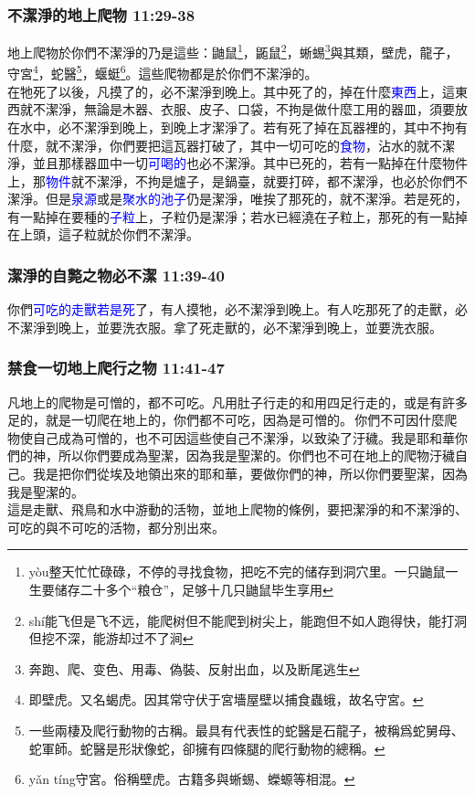 \subsubsection{不潔淨的地上爬物 11:29-38}
地上爬物於你們不潔淨的乃是這些：鼬鼠\footnote{yòu整天忙忙碌碌，不停的寻找食物，把吃不完的储存到洞穴里。一只鼬鼠一生要储存二十多个“粮仓”，足够十几只鼬鼠毕生享用}，鼫鼠\footnote{shí能飞但是飞不远，能爬树但不能爬到树尖上，能跑但不如人跑得快，能打洞但挖不深，能游却过不了涧}，蜥蜴\footnote{奔跑、爬、变色、用毒、偽裝、反射出血，以及断尾逃生}與其類，壁虎，龍子，守宮\footnote{即壁虎。又名蝎虎。因其常守伏于宮墻屋壁以捕食蟲蛾，故名守宮。}，蛇醫\footnote{一些兩棲及爬行動物的古稱。最具有代表性的蛇醫是石龍子，被稱爲蛇舅母、蛇軍師。蛇醫是形狀像蛇，卻擁有四條腿的爬行動物的總稱。}，蝘蜓\footnote{yǎn tíng守宮。俗稱壁虎。古籍多與蜥蜴、蠑螈等相混。}。這些爬物都是於你們不潔淨的。\\
在牠死了以後，凡摸了的，必不潔淨到晚上。其中死了的，掉在什麼\textcolor{blue}{東西}上，這東西就不潔淨，無論是木器、衣服、皮子、口袋，不拘是做什麼工用的器皿，須要放在水中，必不潔淨到晚上，到晚上才潔淨了。若有死了掉在瓦器裡的，其中不拘有什麼，就不潔淨，你們要把這瓦器打破了，其中一切可吃的\textcolor{blue}{食物}，沾水的就不潔淨，並且那樣器皿中一切\textcolor{blue}{可喝的}也必不潔淨。其中已死的，若有一點掉在什麼物件上，那\textcolor{blue}{物件}就不潔淨，不拘是爐子，是鍋臺，就要打碎，都不潔淨，也必於你們不潔淨。但是\textcolor{blue}{泉源}或是\textcolor{blue}{聚水的池子}仍是潔淨，唯挨了那死的，就不潔淨。若是死的，有一點掉在要種的\textcolor{blue}{子粒}上，子粒仍是潔淨；若水已經澆在子粒上，那死的有一點掉在上頭，這子粒就於你們不潔淨。

\subsubsection{潔淨的自斃之物必不潔 11:39-40}
你們\textcolor{blue}{可吃的走獸若是死}了，有人摸牠，必不潔淨到晚上。有人吃那死了的走獸，必不潔淨到晚上，並要洗衣服。拿了死走獸的，必不潔淨到晚上，並要洗衣服。

\subsubsection{禁食一切地上爬行之物 11:41-47}
凡地上的爬物是可憎的，都不可吃。凡用肚子行走的和用四足行走的，或是有許多足的，就是一切爬在地上的，你們都不可吃，因為是可憎的。 你們不可因什麼爬物使自己成為可憎的，也不可因這些使自己不潔淨，以致染了汙穢。我是耶和華你們的神，所以你們要成為聖潔，因為我是聖潔的。你們也不可在地上的爬物汙穢自己。我是把你們從埃及地領出來的耶和華，要做你們的神，所以你們要聖潔，因為我是聖潔的。\\
這是走獸、飛鳥和水中游動的活物，並地上爬物的條例，要把潔淨的和不潔淨的、可吃的與不可吃的活物，都分別出來。



